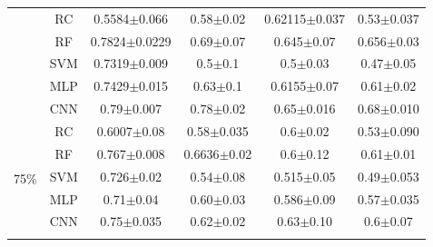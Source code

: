 \begin{table}[h]
\begin{tabular}{c c cccc}
    & RC & \multicolumn{1}{c}{0.5584$\pm$0.066} & \multicolumn{1}{c}{0.58$\pm$0.02} & \multicolumn{1}{c}{0.62115$\pm$0.037} & 0.53$\pm$0.037\\
    & RF & \multicolumn{1}{c}{0.7824$\pm$0.0229} & \multicolumn{1}{c}{0.69$\pm$0.07} & \multicolumn{1}{c}{0.645$\pm$0.07} & 0.656$\pm$0.03\\
   
    & SVM & \multicolumn{1}{c}{0.7319$\pm$0.009} & \multicolumn{1}{c}{0.5$\pm$0.1} & \multicolumn{1}{c}{0.5$\pm$0.03} & 0.47$\pm$0.05\\
    & MLP & \multicolumn{1}{c}{0.7429$\pm$0.015} & \multicolumn{1}{c}{0.63$\pm$0.1} & \multicolumn{1}{c}{0.6155$\pm$0.07} & 0.61$\pm$0.02\\   
    & CNN & \multicolumn{1}{c}{0.79$\pm$0.007} & \multicolumn{1}{c}{0.78$\pm$0.02} & \multicolumn{1}{c}{0.65$\pm$0.016} & 0.68$\pm$0.010\\
    \midrule
    \multirow{7}{*}{75\%}
   
    & RC & \multicolumn{1}{c}{0.6007$\pm$0.08} & \multicolumn{1}{c}{0.58$\pm$0.035} & \multicolumn{1}{c}{0.6$\pm$0.02} & 0.53$\pm$0.090\\
    & RF & \multicolumn{1}{c}{0.767$\pm$0.008} & \multicolumn{1}{c}{0.6636$\pm$0.02} & \multicolumn{1}{c}{0.6$\pm$0.12} & 0.61$\pm$0.01\\
   
    & SVM & \multicolumn{1}{c}{0.726$\pm$0.02} & \multicolumn{1}{c}{0.54$\pm$0.08} & \multicolumn{1}{c}{0.515$\pm$0.05} & 0.49$\pm$0.053\\
    & MLP & \multicolumn{1}{c}{0.71$\pm$0.04} & \multicolumn{1}{c}{0.60$\pm$0.03} & \multicolumn{1}{c}{0.586$\pm$0.09} & 0.57$\pm$0.035\\  
    & CNN & \multicolumn{1}{c}{0.75$\pm$0.035} & \multicolumn{1}{c}{0.62$\pm$0.02} & \multicolumn{1}{c}{0.63$\pm$0.10} & 0.6$\pm$0.07\\
    \midrule
    \multirow{7}{*}{80\%}
   

\end{tabular}
\end{table}
